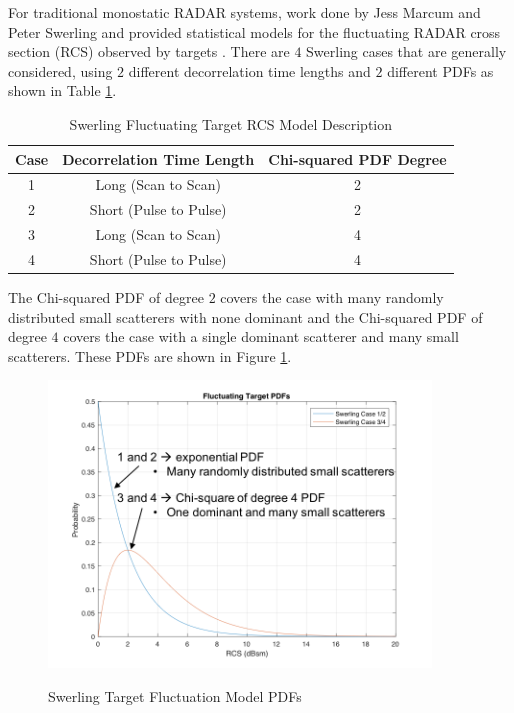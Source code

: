 For traditional monostatic RADAR systems, work done by Jess Marcum and Peter Swerling and provided statistical models for the fluctuating RADAR cross section (RCS) observed by targets \cite{richards_radar}. There are $4$ Swerling cases that are generally considered, using $2$ different decorrelation time lengths and $2$ different PDFs as shown in Table \ref{ms_tab:1}. 

\begin{table}[H]
  \begin{center}
      \renewcommand{\baselinestretch}{1} \small\normalsize
  \begin{quote}
    \caption[Swerling Fluctuating Target RCS Model Description]{Swerling Fluctuating Target RCS Model Description\label{ms_tab:1}}
  \end{quote}
  \begin{tabular} {|c | c | c |}
    \hline
  \bf{Case} & \bf{Decorrelation Time Length} & \bf{Chi-squared PDF Degree} \\ \hline
  1 &Long (Scan to Scan) &2 \\ \hline
  2 &Short (Pulse to Pulse) &2 \\ \hline
  3 &Long (Scan to Scan) &4 \\ \hline
  4 &Short (Pulse to Pulse) &4 \\ \hline
\end{tabular}
\end{center}
\end{table}
\renewcommand{\baselinestretch}{2} \small\normalsize
The Chi-squared PDF of degree $2$ covers the case with many randomly distributed small scatterers with none dominant and the Chi-squared PDF of degree $4$ covers the case with a single dominant scatterer and many small scatterers. These PDFs are shown in Figure \ref{ms_fig:2}.
\begin{figure}[H]
  \begin{center}
\includegraphics[width=4in]{../media/multistatic/swerling_pdfs.png}
  \end{center}
  \renewcommand{\baselinestretch}{1} \small\normalsize
  \begin{quote}
    \caption[Swerling Target Fluctuation Model PDFs]{Swerling Target Fluctuation Model PDFs\label{ms_fig:2}}
  \end{quote}
\end{figure}
\renewcommand{\baselinestretch}{2} \small\normalsize

